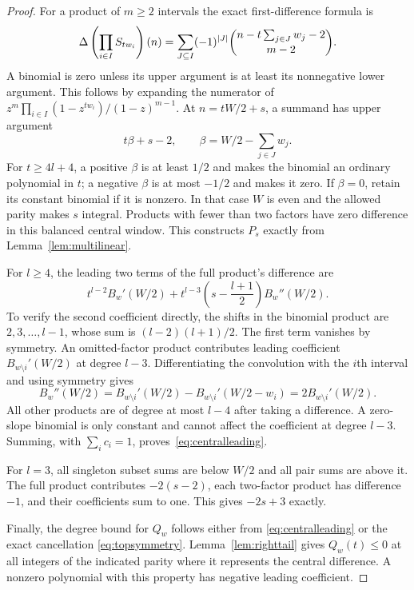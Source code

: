 \begin{proof}
For a product of $m\ge2$ intervals the exact first-difference formula is
\begin{equation}\label{eq:centralbinomial}
 \Delta\left(\prod_{i\in I}S_{tw_i}\right)(n)
 =\sum_{J\subseteq I}(-1)^{|J|}
    \binom{n-t\sum_{j\in J}w_j-2}{m-2}.
\end{equation}
A binomial is zero unless its upper argument is at least its
nonnegative lower argument. This follows by expanding the numerator
of $z^m\prod_{i\in I}(1-z^{tw_i})/(1-z)^{m-1}$.
At $n=tW/2+s$, a summand has upper argument
\[
 t\beta+s-2,\qquad \beta=W/2-\sum_{j\in J}w_j.
\]
For $t\ge4l+4$, a positive $\beta$ is at least $1/2$ and makes the
binomial an ordinary polynomial in $t$; a negative $\beta$ is at
most $-1/2$ and makes it zero. If $\beta=0$, retain its constant
binomial if it is nonzero. In that case $W$ is even and the allowed
parity makes $s$ integral. Products with fewer than two factors have
zero difference in this balanced central window. This constructs
$P_s$ exactly from Lemma~\ref{lem:multilinear}.

For $l\ge4$, the leading two terms of the full product's difference
are
\[
 t^{l-2}B_w'(W/2)
 +t^{l-3}\left(s-\frac{l+1}{2}\right)B_w''(W/2).
\]
To verify the second coefficient directly, the shifts in the
binomial product are $2,3,\ldots,l-1$, whose sum is
$(l-2)(l+1)/2$. The first term vanishes by symmetry.
An omitted-factor product contributes leading coefficient
$B_{w\setminus i}'(W/2)$ at degree $l-3$. Differentiating the
convolution with the $i$th interval and using symmetry gives
\[
 B_w''(W/2)=B_{w\setminus i}'(W/2)
              -B_{w\setminus i}'(W/2-w_i)
           =2B_{w\setminus i}'(W/2).
\]
All other products are of degree at most $l-4$ after taking a
difference. A zero-slope binomial is only constant and cannot affect
the coefficient at degree $l-3$. Summing, with $\sum_i c_i=1$,
proves~\eqref{eq:centralleading}.

For $l=3$, all singleton subset sums are below $W/2$ and all pair
sums are above it. The full product contributes $-2(s-2)$, each
two-factor product has difference $-1$, and their coefficients sum
to one. This gives $-2s+3$ exactly.

Finally, the degree bound for $Q_w$ follows either from
\eqref{eq:centralleading} or the exact cancellation
\eqref{eq:topsymmetry}. Lemma~\ref{lem:righttail} gives $Q_w(t)\le0$
at all integers of the indicated parity where it represents the
central difference. A nonzero polynomial with this property has
negative leading coefficient.
\end{proof}

